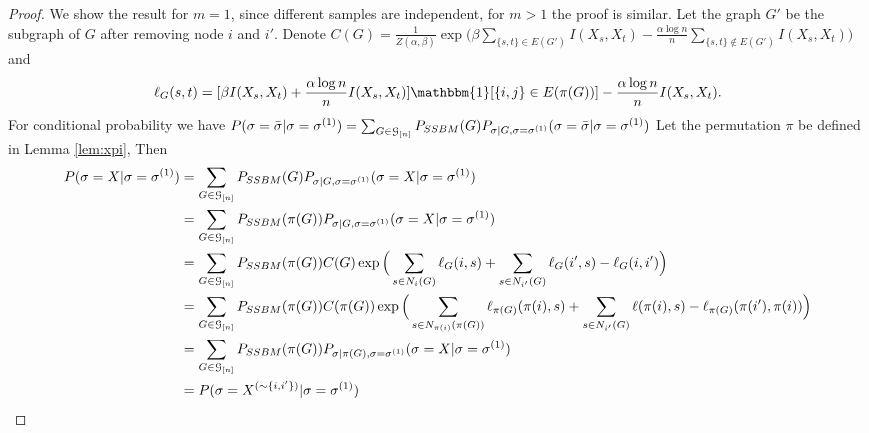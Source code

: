 \documentclass{article}
\begin{document}
\begin{proof}
We show the result for $m=1$, since different samples are independent, for $m>1$ the proof is similar. Let the graph $G'$ be the subgraph of $G$ after removing node $i$ and
$i'$. Denote $C(G) = \frac{1}{Z(\alpha, \beta)} \exp\Big(\beta \sum_{\{s,t\} \in E(G')} I(X_s, X_t) - \frac{\alpha \log n }{n} \sum_{\{s,t\} \not\in E(G')} I(X_s, X_t)\Big)$
and 
$$
\ell_G(s,t) = [\beta I(X_s, X_t) + \frac{\alpha \log n}{n} I(X_s, X_t)] \mathbbm{1}[\{i, j\}\in E(\pi(G))] - \frac{\alpha \log n}{n} I(X_s, X_t).
$$
For conditional probability we have
$ P(\sigma = \bar{\sigma} | \sigma=\sigma^{(1)}) = \sum_{G\in\mathcal{G}_{[n]}} P_{SSBM}(G) P_{\sigma|G, \sigma=\sigma^{(1)}}(\sigma = \bar{\sigma} | \sigma=\sigma^{(1)}) $
Let the permutation $\pi$ be defined in Lemma \ref{lem:xpi}, 
Then 
\begin{align*}
P(\sigma = X | \sigma=\sigma^{(1)}) & = \sum_{G\in\mathcal{G}_{[n]}} P_{SSBM}(G) P_{\sigma|G, \sigma=\sigma^{(1)}}(\sigma = X | \sigma=\sigma^{(1)}) \\
& = \sum_{G\in\mathcal{G}_{[n]}} P_{SSBM}(\pi(G)) P_{\sigma|G, \sigma=\sigma^{(1)}}(\sigma = X | \sigma=\sigma^{(1)}) \\
& = \sum_{G\in\mathcal{G}_{[n]}} P_{SSBM}(\pi(G)) C(G) \exp\Big(\sum_{s \in N_i(G)} \ell_G(i,s) + \sum_{s \in N_{i'}(G)} \ell_G(i',s) - \ell_G(i,i') \Big)\\
& = \sum_{G\in\mathcal{G}_{[n]}} P_{SSBM}(\pi(G)) C(\pi(G)) \exp\Big(\sum_{s \in N_{\pi(i)}(\pi(G))} \ell_{\pi(G)}(\pi(i),s) + \sum_{s \in N_{i'}(G)} \ell(\pi(i),s) - \ell_{\pi(G)}(\pi(i'),\pi(i)) \Big)\\
&= \sum_{G\in\mathcal{G}_{[n]}} P_{SSBM}(\pi(G)) P_{\sigma|\pi(G), \sigma=\sigma^{(1)}}(\sigma = X | \sigma=\sigma^{(1)}) \\
& = P(\sigma = X^{(\sim\{i,i'\})} | \sigma=\sigma^{(1)})
\end{align*}
\end{proof}
\end{document}
